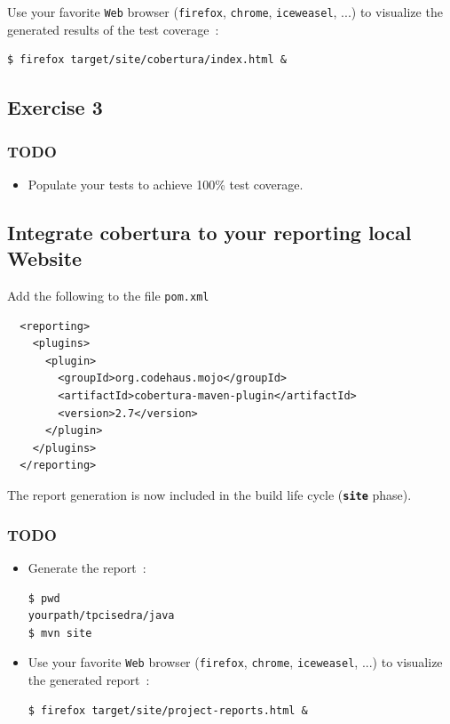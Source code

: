 \documentclass{article}
\begin{document}
Use your favorite \texttt{Web} browser (\texttt{firefox}, \texttt{chrome}, \texttt{iceweasel}, ...) to visualize the generated results of the test coverage~:
\begin{lstlisting}
$ firefox target/site/cobertura/index.html &
\end{lstlisting}

\subsection{Exercise 3}

\subsubsection{TODO}

\begin{itemize}
\item Populate your tests to achieve 100\% test coverage.
\end{itemize}


\subsection{Integrate cobertura to your reporting local Website}

Add the following to the file  \texttt{pom.xml}
\begin{lstlisting}
  <reporting>
    <plugins>
      <plugin>
        <groupId>org.codehaus.mojo</groupId>
        <artifactId>cobertura-maven-plugin</artifactId>
        <version>2.7</version>
      </plugin>
    </plugins>
  </reporting>
\end{lstlisting}

The report generation is now included in the build life cycle (\textbf{\texttt{site}} phase).

\subsubsection{TODO}

\begin{itemize}
\item Generate the report~:
\begin{lstlisting}
$ pwd
yourpath/tpcisedra/java
$ mvn site
\end{lstlisting}

\item Use your favorite \texttt{Web} browser (\texttt{firefox}, \texttt{chrome}, \texttt{iceweasel}, ...) to visualize the generated report~:
\begin{lstlisting}
$ firefox target/site/project-reports.html &
\end{lstlisting}
\end{itemize}
\end{document}
